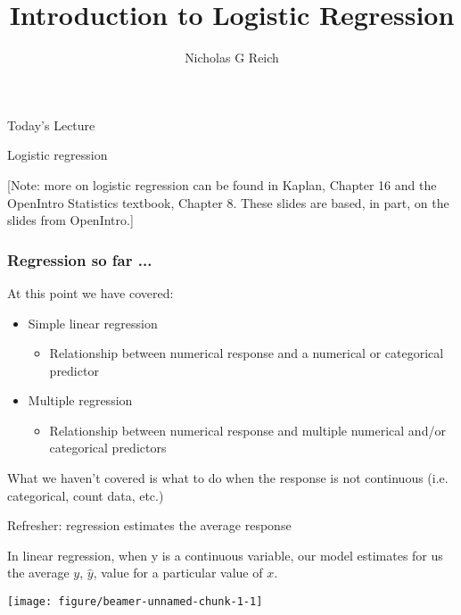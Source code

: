 \documentclass[table]{beamer}\usepackage[]{graphicx}\usepackage[]{color}
\title{Introduction to Logistic Regression}
\author{Nicholas G Reich}
\makeatletter
\def\maxwidth{ %
  \ifdim\Gin@nat@width>\linewidth
    \linewidth
  \else
    \Gin@nat@width
  \fi
}
\newenvironment{knitrout}{}{} %
\makeatother
\begin{document}
\begin{frame}[plain]
        \titlepage
\end{frame}





\begin{frame}{Today's Lecture}


\bi
	\myitem Logistic regression
\ei

[Note: more on logistic regression can be found in Kaplan, Chapter 16 and the OpenIntro Statistics textbook, Chapter 8. These slides are based, in part, on the slides from OpenIntro.]

\end{frame}


\begin{frame}
\frametitle{Regression so far ...}
    
At this point we have covered:

{\small
\begin{itemize}
\item Simple linear regression
\begin{itemize}
\item Relationship between numerical response and a numerical or categorical predictor
\end{itemize}
\item Multiple regression
\begin{itemize}
\item Relationship between numerical response and multiple numerical and/or categorical predictors
\end{itemize}
\end{itemize}
}


What we haven't covered is what to do when the response is not continuous (i.e. categorical, count data, etc.)


\end{frame}



\begin{frame}[fragile]{Refresher: regression estimates the average response}

In linear regression, when y is a continuous variable, our model estimates for us the average $y$, $\hat y$, value for a particular value of $x$.

\begin{knitrout}\scriptsize
{}\color{fgcolor}

{\centering \texttt{[image: figure/beamer-unnamed-chunk-1-1]} 

}



\end{knitrout}

\end{frame}
\end{document}
